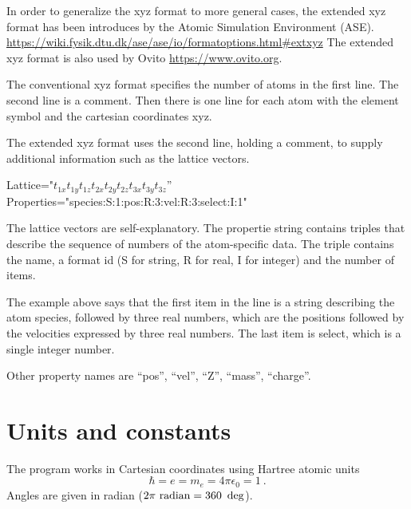 \documentclass[final,12pt,makeidx,DIV=calc]{article}
\begin{document}
{{{{{{In order to generalize the xyz format to more general cases, the
extended xyz format has been introduces by the Atomic Simulation
Environment
(ASE). \url{https://wiki.fysik.dtu.dk/ase/ase/io/formatoptions.html#extxyz}
The extended xyz format is also used by Ovito
\url{https://www.ovito.org}.

The conventional xyz format specifies the number of atoms in the first
line. The second line is a comment. Then there is one line for each
atom with the element symbol and the cartesian coordinates xyz.


The extended xyz format uses the second line, holding a comment, to
supply additional information such as the lattice vectors.

\begin{centerline}
Lattice="$t_{1x} t_{1y} t_{1z} t_{2x} t_{2y} t_{2z}  t_{3x} t_{3y} t_{3z}$''
Properties="species:S:1:pos:R:3:vel:R:3:select:I:1"
\end{centerline}
The lattice vectors are self-explanatory. The propertie string
contains triples that describe the sequence of numbers of the
atom-specific data. The triple contains the name, a format id (S for
string, R for real, I for integer) and the number of items.

The example above says that the first item in the line is a string
describing the atom species, followed by three real numbers, which are
the positions followed by the velocities expressed by three real
numbers. The last item is select, which is a single integer number.

Other property names are ``pos'', ``vel'', ``Z'', ``mass'', ``charge''.


\newpage
\section{Units and constants}
\label{constants}

The program works in Cartesian coordinates using Hartree atomic units
\begin{equation}
\hbar=e=m_e=4\pi\epsilon_0=1 \ .
\end{equation}
Angles are given in radian ($2\pi~{\rm radian}=360~\deg$).

}}}}}}
\end{document}
